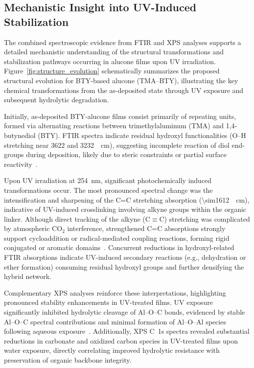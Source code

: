 \subsection{Mechanistic Insight into UV-Induced Stabilization}

The combined spectroscopic evidence from FTIR and XPS analyses supports a detailed mechanistic understanding of the structural transformations and stabilization pathways occurring in alucone films upon UV irradiation. Figure~\ref{fig:structure_evolution} schematically summarizes the proposed structural evolution for BTY-based alucone (TMA--BTY), illustrating the key chemical transformations from the as-deposited state through UV exposure and subsequent hydrolytic degradation.

Initially, as-deposited BTY-alucone films consist primarily of repeating  units, formed via alternating reactions between trimethylaluminum (TMA) and 1,4-butynediol (BTY). FTIR spectra indicate residual hydroxyl functionalities (O--H stretching near 3622 and 3232~\si{\per\centi\meter}), suggesting incomplete reaction of diol end-groups during deposition, likely due to steric constraints or partial surface reactivity~\cite{REF}.

Upon UV irradiation at \SI{254}{\nano\meter}, significant photochemically induced transformations occur. The most pronounced spectral change was the intensification and sharpening of the C=C stretching absorption (\SI{\sim1612}{\per\centi\meter}), indicative of UV-induced crosslinking involving alkyne groups within the organic linker. Although direct tracking of the alkyne (C$\equiv$C) stretching was complicated by atmospheric CO$_2$ interference, strengthened C=C absorptions strongly support cycloaddition or radical-mediated coupling reactions, forming rigid conjugated or aromatic domains~\cite{REF}. Concurrent reductions in hydroxyl-related FTIR absorptions indicate UV-induced secondary reactions (e.g., dehydration or ether formation) consuming residual hydroxyl groups and further densifying the hybrid network.

Complementary XPS analyses reinforce these interpretations, highlighting pronounced stability enhancements in UV-treated films. UV exposure significantly inhibited hydrolytic cleavage of Al--O--C bonds, evidenced by stable Al--O--C spectral contributions and minimal formation of Al--O--Al species following aqueous exposure~\cite{REF}. Additionally, XPS C~1s spectra revealed substantial reductions in carbonate and oxidized carbon species in UV-treated films upon water exposure, directly correlating improved hydrolytic resistance with preservation of organic backbone integrity.

